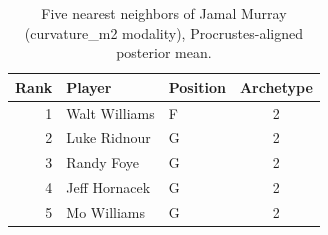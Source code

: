 \begin{table}[htbp]
  \centering\small
  \begin{tabular}{rllc}
    \toprule
    Rank & Player & Position & Archetype \\
    \midrule
    1 & Walt Williams & F & 2 \\
    2 & Luke Ridnour & G & 2 \\
    3 & Randy Foye & G & 2 \\
    4 & Jeff Hornacek & G & 2 \\
    5 & Mo Williams & G & 2 \\
    \bottomrule
  \end{tabular}
  \caption{Five nearest neighbors of Jamal Murray (curvature_m2 modality), Procrustes-aligned posterior mean.}
  \label{tab:Jamal_Murray_neighbors_curvature_m2}
\end{table}

